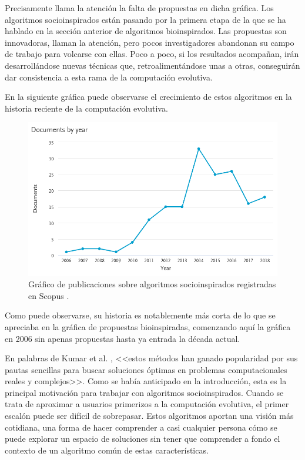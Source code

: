 Precisamente llama la atención la falta de propuestas en dicha gráfica. Los algoritmos socioinspirados están pasando por la primera etapa de la que se ha hablado en la sección anterior de algoritmos bioinspirados. Las propuestas son innovadoras, llaman la atención, pero pocos investigadores abandonan su campo de trabajo para volcarse con ellas. Poco a poco, si los resultados acompañan, irán desarrollándose nuevas técnicas que, retroalimentándose unas a otras, conseguirán dar consistencia a esta rama de la computación evolutiva.

En la siguiente gráfica puede observarse el crecimiento de estos algoritmos en la historia reciente de la computación evolutiva.

\begin{figure}[h]
	\centering
	\includegraphics[scale=0.4]{imagenes/scopus-grafico-socioinspirados.png}
	\caption{Gráfico de publicaciones sobre algoritmos socioinspirados registradas en Scopus \cite{scopus-website}.}
	\label{scopus-socioinspirados}
\end{figure}

Como puede observarse, su historia es notablemente más corta de lo que se apreciaba en la gráfica de propuestas bioinspiradas, comenzando aquí la gráfica en 2006 sin apenas propuestas hasta ya entrada la década actual.

En palabras de Kumar et al. \cite{socio-evolution-algorithm}, <<estos métodos han ganado popularidad por sus pautas sencillas para buscar soluciones óptimas en problemas computacionales reales y complejos>>. Como se había anticipado en la introducción, esta es la principal motivación para trabajar con algoritmos socioinspirados. Cuando se trata de aproximar a usuarios primerizos a la computación evolutiva, el primer escalón puede ser difícil de sobrepasar. Estos algoritmos aportan una visión más cotidiana, una forma de hacer comprender a casi cualquier persona cómo se puede explorar un espacio de soluciones sin tener que comprender a fondo el contexto de un algoritmo común de estas características.

